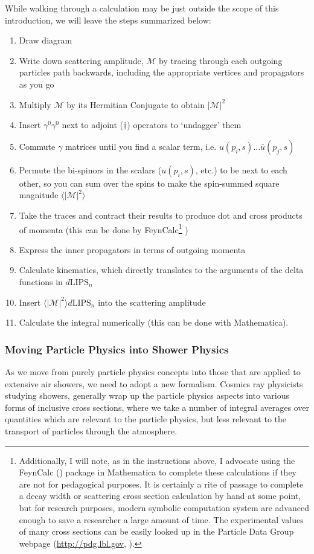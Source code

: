 While walking through a calculation may be just outside the scope of this introduction, we will leave the steps summarized below:
\begin{enumerate}
\item Draw diagram
\item Write down scattering amplitude, $\mathcal{M}$ by tracing through each outgoing particles path backwards, including the appropriate vertices and propagators as you go
\item Multiply $\mathcal{M}$ by its Hermitian Conjugate to obtain $|\mathcal{M}|^2$
\item Insert $\gamma^0\gamma^0$ next to adjoint ($\dagger$) operators to `undagger' them
\item Commute $\gamma$ matrices until you find a scalar term, i.e. $u(p_i,s)...\bar{u}(p_j,s)$
\item Permute the bi-spinors in the scalars ($u(p_i,s)$, etc.) to be next to each other, so you can sum over the spins to make the spin-summed square magnitude $\langle |\mathcal{M}|^2\rangle$
\item Take the traces and contract their results to produce dot and cross products of momenta (this can be done by FeynCalc\footnote{Additionally, I will note, as in the instructions above, I advocate using the FeynCalc (\cite{feyncalc1,feyncalc2}) package in Mathematica to complete these calculations if they are not for pedagogical purposes. It is certainly a rite of passage to complete a decay width or scattering cross section calculation by hand at some point, but for research purposes, modern symbolic computation system are advanced enough to save a researcher a large amount of time. The experimental values of many cross sections can be easily looked up in the Particle Data Group webpage (\url{http://pdg.lbl.gov}, \textcite{pdg}). } \cite{feyncalc1,feyncalc2})
\item Express the inner propagators in terms of outgoing momenta
\item Calculate kinematics, which directly translates to the arguments of the delta functions in $d\mbox{LIPS}_n$
\item Insert $\langle |\mathcal{M}|^2\rangle d\mbox{LIPS}_n$ into the scattering amplitude
\item Calculate the integral numerically (this can be done with Mathematica).
\end{enumerate}

\subsubsection{Moving Particle Physics into Shower Physics}
As we move from purely particle physics concepts into those that are applied to extensive air showers, we need to adopt a new formalism. Cosmics ray physicists studying showers, generally wrap up the particle physics aspects into various forms of inclusive cross sections, where we take a number of integral averages over quantities which are relevant to the particle physics, but less relevant to the transport of particles through the atmosphere. 

